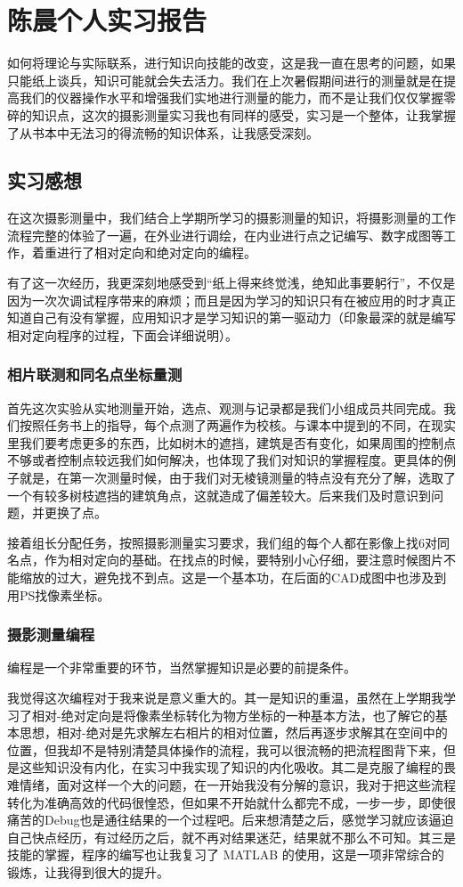 \chapter{陈晨个人实习报告}

如何将理论与实际联系，进行知识向技能的改变，这是我一直在思考的问题，如果只能纸上谈兵，知识可能就会失去活力。我们在上次暑假期间进行的测量就是在提高我们的仪器操作水平和增强我们实地进行测量的能力，而不是让我们仅仅掌握零碎的知识点，这次的摄影测量实习我也有同样的感受，实习是一个整体，让我掌握了从书本中无法习的得流畅的知识体系，让我感受深刻。

\section{实习感想}

在这次摄影测量中，我们结合上学期所学习的摄影测量的知识，将摄影测量的工作流程完整的体验了一遍，在外业进行调绘，在内业进行点之记编写、数字成图等工作，着重进行了相对定向和绝对定向的编程。

有了这一次经历，我更深刻地感受到“纸上得来终觉浅，绝知此事要躬行”，不仅是因为一次次调试程序带来的麻烦；而且是因为学习的知识只有在被应用的时才真正知道自己有没有掌握，应用知识才是学习知识的第一驱动力（印象最深的就是编写相对定向程序的过程，下面会详细说明）。


\subsection{相片联测和同名点坐标量测}
首先这次实验从实地测量开始，选点、观测与记录都是我们小组成员共同完成。我们按照任务书上的指导，每个点测了两遍作为校核。与课本中提到的不同，在现实里我们要考虑更多的东西，比如树木的遮挡，建筑是否有变化，如果周围的控制点不够或者控制点较远我们如何解决，也体现了我们对知识的掌握程度。更具体的例子就是，在第一次测量时候，由于我们对无棱镜测量的特点没有充分了解，选取了一个有较多树枝遮挡的建筑角点，这就造成了偏差较大。后来我们及时意识到问题，并更换了点。

接着组长分配任务，按照摄影测量实习要求，我们组的每个人都在影像上找6对同名点，作为相对定向的基础。在找点的时候，要特别小心仔细，要注意时候图片不能缩放的过大，避免找不到点。这是一个基本功，在后面的CAD成图中也涉及到用PS找像素坐标。

\subsection{摄影测量编程}
编程是一个非常重要的环节，当然掌握知识是必要的前提条件。

我觉得这次编程对于我来说是意义重大的。其一是知识的重温，虽然在上学期我学习了相对-绝对定向是将像素坐标转化为物方坐标的一种基本方法，也了解它的基本思想，相对-绝对是先求解左右相片的相对位置，然后再逐步求解其在空间中的位置，但我却不是特别清楚具体操作的流程，我可以很流畅的把流程图背下来，但是这些知识没有内化，在实习中我实现了知识的内化吸收。其二是克服了编程的畏难情绪，面对这样一个大的问题，在一开始我没有分解的意识，我对于把这些流程转化为准确高效的代码很惶恐，但如果不开始就什么都完不成，一步一步，即使很痛苦的Debug也是通往结果的一个过程吧。后来想清楚之后，感觉学习就应该逼迫自己快点经历，有过经历之后，就不再对结果迷茫，结果就不那么不可知。其三是技能的掌握，程序的编写也让我复习了 MATLAB 的使用，这是一项非常综合的锻炼，让我得到很大的提升。

